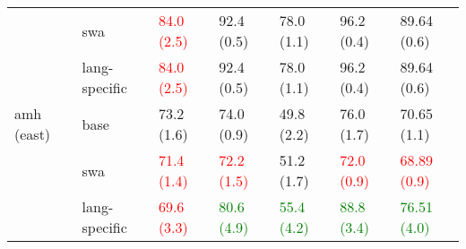 \begin{tabular}{lllllll}
           & swa &                      \textcolor{red}{84.0 (2.5)} &                      92.4 (0.5) &                                       78.0 (1.1) &                                       96.2 (0.4) &                                       89.64 (0.6) \\
           & lang-specific &                      \textcolor{red}{84.0 (2.5)} &                      92.4 (0.5) &                                       78.0 (1.1) &                                       96.2 (0.4) &                                       89.64 (0.6) \\
\midrule
amh (east) & base &                                       73.2 (1.6) &                      74.0 (0.9) &                                       49.8 (2.2) &                                       76.0 (1.7) &                                       70.65 (1.1) \\
           & swa &                      \textcolor{red}{71.4 (1.4)} &     \textcolor{red}{72.2 (1.5)} &                                       51.2 (1.7) &                      \textcolor{red}{72.0 (0.9)} &                      \textcolor{red}{68.89 (0.9)} \\
           & lang-specific &  \textcolor{orange}{\textcolor{red}{69.6 (3.3)}} &   \textcolor{green}{80.6 (4.9)} &                    \textcolor{green}{55.4 (4.2)} &                    \textcolor{green}{88.8 (3.4)} &                    \textcolor{green}{76.51 (4.0)} \\
\bottomrule
\end{tabular}
